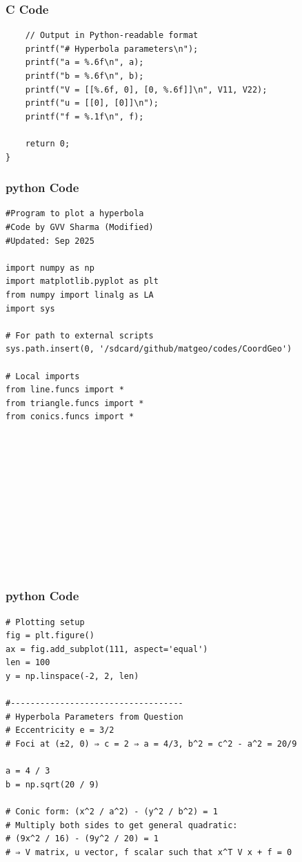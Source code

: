 \documentclass{beamer}
\begin{document}
\begin{frame}[fragile]
    \frametitle{C Code }
    \begin{lstlisting}
    // Output in Python-readable format
    printf("# Hyperbola parameters\n");
    printf("a = %.6f\n", a);
    printf("b = %.6f\n", b);
    printf("V = [[%.6f, 0], [0, %.6f]]\n", V11, V22);
    printf("u = [[0], [0]]\n");
    printf("f = %.1f\n", f);

    return 0;
}
    \end{lstlisting}
\end{frame}
\begin{frame}[fragile]
    \frametitle{python Code }
    \begin{lstlisting}
#Program to plot a hyperbola 
#Code by GVV Sharma (Modified)
#Updated: Sep 2025

import numpy as np
import matplotlib.pyplot as plt
from numpy import linalg as LA
import sys

# For path to external scripts
sys.path.insert(0, '/sdcard/github/matgeo/codes/CoordGeo')

# Local imports
from line.funcs import *
from triangle.funcs import *
from conics.funcs import *












  \end{lstlisting}
\end{frame}
\begin{frame}[fragile]
    \frametitle{python Code }
    \begin{lstlisting}
# Plotting setup
fig = plt.figure()
ax = fig.add_subplot(111, aspect='equal')
len = 100
y = np.linspace(-2, 2, len)

#-----------------------------------
# Hyperbola Parameters from Question
# Eccentricity e = 3/2
# Foci at (±2, 0) ⇒ c = 2 ⇒ a = 4/3, b^2 = c^2 - a^2 = 20/9

a = 4 / 3
b = np.sqrt(20 / 9)

# Conic form: (x^2 / a^2) - (y^2 / b^2) = 1
# Multiply both sides to get general quadratic: 
# (9x^2 / 16) - (9y^2 / 20) = 1
# ⇒ V matrix, u vector, f scalar such that x^T V x + f = 0

\end{lstlisting}
\end{frame}
\end{document}
